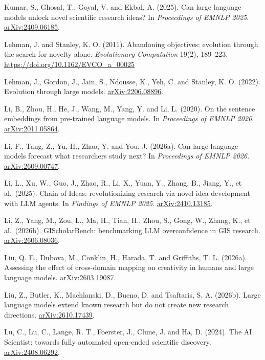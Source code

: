 \documentclass[
  10pt,
]{article}
\begin{document}
\hypertarget{ref-Kumar2025}{}Kumar, S.,
Ghosal, T., Goyal, V. and Ekbal, A.
(2025). Can large language models unlock
novel scientific research ideas? In
\emph{Proceedings of EMNLP 2025}.
\href{https://arxiv.org/abs/2409.06185}{arXiv:2409.06185}.

\hypertarget{ref-Lehman2011}{}Lehman, J.
and Stanley, K. O. (2011). Abandoning
objectives: evolution through the search
for novelty alone. \emph{Evolutionary
Computation} 19(2), 189--223.
\url{https://doi.org/10.1162/EVCO_a_00025}

\hypertarget{ref-Lehman2022}{}Lehman,
J., Gordon, J., Jain, S., Ndousse, K.,
Yeh, C. and Stanley, K. O. (2022).
Evolution through large models.
\href{https://arxiv.org/abs/2206.08896}{arXiv:2206.08896}.

\hypertarget{ref-Li2020}{}Li, B., Zhou,
H., He, J., Wang, M., Yang, Y. and Li,
L. (2020). On the sentence embeddings
from pre-trained language models. In
\emph{Proceedings of EMNLP 2020}.
\href{https://arxiv.org/abs/2011.05864}{arXiv:2011.05864}.

\hypertarget{ref-Li2026a}{}Li, F., Tang,
Z., Yu, H., Zhao, Y. and You, J.
(2026a). Can large language models
forecast what researchers study next? In
\emph{Proceedings of EMNLP 2026}.
\href{https://arxiv.org/abs/2609.00747}{arXiv:2609.00747}.

\hypertarget{ref-Li2025}{}Li, L., Xu,
W., Guo, J., Zhao, R., Li, X., Yuan, Y.,
Zhang, B., Jiang, Y., et al.~(2025).
Chain of Ideas: revolutionizing research
via novel idea development with LLM
agents. In \emph{Findings of EMNLP
2025}.
\href{https://arxiv.org/abs/2410.13185}{arXiv:2410.13185}.

\hypertarget{ref-Li2026b}{}Li, Z., Yang,
M., Zou, L., Ma, H., Tian, H., Zhou, S.,
Gong, W., Zhang, K., et al.~(2026b).
GIScholarBench: benchmarking LLM
overconfidence in GIS research.
\href{https://arxiv.org/abs/2606.08036}{arXiv:2606.08036}.

\hypertarget{ref-Liu2026a}{}Liu, Q. E.,
Dubova, M., Conklin, H., Harada, T. and
Griffiths, T. L. (2026a). Assessing the
effect of cross-domain mapping on
creativity in humans and large language
models.
\href{https://arxiv.org/abs/2603.19087}{arXiv:2603.19087}.

\hypertarget{ref-Liu2026b}{}Liu, Z.,
Butler, K., Machlanski, D., Bueno, D.
and Tsaftaris, S. A. (2026b). Large
language models extend known research
but do not create new research
directions.
\href{https://arxiv.org/abs/2610.17439}{arXiv:2610.17439}.

\hypertarget{ref-Lu2024}{}Lu, C., Lu,
C., Lange, R. T., Foerster, J., Clune,
J. and Ha, D. (2024). The AI Scientist:
towards fully automated open-ended
scientific discovery.
\href{https://arxiv.org/abs/2408.06292}{arXiv:2408.06292}.
\end{document}
